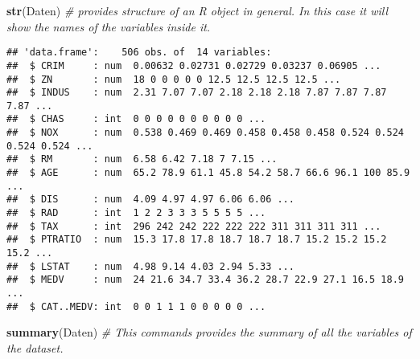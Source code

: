 \documentclass[
]{article}
\newenvironment{Shaded}{\begin{snugshade}}{\end{snugshade}}
\newcommand{\CommentTok}[1]{\textcolor[rgb]{0.56,0.35,0.01}{\textit{#1}}}
\newcommand{\FunctionTok}[1]{\textcolor[rgb]{0.13,0.29,0.53}{\textbf{#1}}}
\newcommand{\NormalTok}[1]{#1}
\begin{document}
\begin{Shaded}
\begin{Highlighting}[]
\FunctionTok{str}\NormalTok{(Daten) }\CommentTok{\# provides structure of an R object in general. In this case it will show the names of the variables inside it. }
\end{Highlighting}
\end{Shaded}

\begin{verbatim}
## 'data.frame':    506 obs. of  14 variables:
##  $ CRIM     : num  0.00632 0.02731 0.02729 0.03237 0.06905 ...
##  $ ZN       : num  18 0 0 0 0 0 12.5 12.5 12.5 12.5 ...
##  $ INDUS    : num  2.31 7.07 7.07 2.18 2.18 2.18 7.87 7.87 7.87 7.87 ...
##  $ CHAS     : int  0 0 0 0 0 0 0 0 0 0 ...
##  $ NOX      : num  0.538 0.469 0.469 0.458 0.458 0.458 0.524 0.524 0.524 0.524 ...
##  $ RM       : num  6.58 6.42 7.18 7 7.15 ...
##  $ AGE      : num  65.2 78.9 61.1 45.8 54.2 58.7 66.6 96.1 100 85.9 ...
##  $ DIS      : num  4.09 4.97 4.97 6.06 6.06 ...
##  $ RAD      : int  1 2 2 3 3 3 5 5 5 5 ...
##  $ TAX      : int  296 242 242 222 222 222 311 311 311 311 ...
##  $ PTRATIO  : num  15.3 17.8 17.8 18.7 18.7 18.7 15.2 15.2 15.2 15.2 ...
##  $ LSTAT    : num  4.98 9.14 4.03 2.94 5.33 ...
##  $ MEDV     : num  24 21.6 34.7 33.4 36.2 28.7 22.9 27.1 16.5 18.9 ...
##  $ CAT..MEDV: int  0 0 1 1 1 0 0 0 0 0 ...
\end{verbatim}

\begin{Shaded}
\begin{Highlighting}[]
\FunctionTok{summary}\NormalTok{(Daten) }\CommentTok{\# This commands provides the summary of all the variables of the dataset.}
\end{Highlighting}
\end{Shaded}
\end{document}
